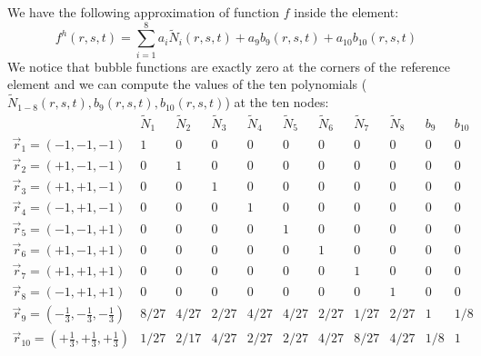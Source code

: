 We have the following approximation of function $f$ inside the element:
\[
f^h(r,s,t) = \sum_{i=1}^{8} a_i \tilde{N}_i(r,s,t) + a_9 b_9(r,s,t) + a_{10} b_{10}(r,s,t)
\]
We notice that bubble functions are exactly zero at the corners of the reference element and
we can compute the values of the ten polynomials ($\tilde{N}_{1-8}(r,s,t),b_9(r,s,t),b_{10}(r,s,t)$) 
at the ten nodes:
\[
\begin{array}{c|cccccccccc}
 & \tilde{N}_1 & \tilde{N}_2 & \tilde{N}_3 & \tilde{N}_4 & \tilde{N}_5 
 & \tilde{N}_6 & \tilde{N}_7 & \tilde{N}_8 & b_9 & b_{10}\\
 \hline\hline
\vec{r}_1=(-1,-1,-1)    &1 &0 &0 &0 &0 &0 &0 &0 &0 &0 \\
\vec{r}_2=(+1,-1,-1)    &0 &1 &0 &0 &0 &0 &0 &0 &0 &0 \\
\vec{r}_3=(+1,+1,-1)    &0 &0 &1 &0 &0 &0 &0 &0 &0 &0 \\
\vec{r}_4=(-1,+1,-1)    &0 &0 &0 &1 &0 &0 &0 &0 &0 &0 \\
\vec{r}_5=(-1,-1,+1)    &0 &0 &0 &0 &1 &0 &0 &0 &0 &0 \\
\vec{r}_6=(+1,-1,+1)    &0 &0 &0 &0 &0 &1 &0 &0 &0 &0 \\
\vec{r}_7=(+1,+1,+1)    &0 &0 &0 &0 &0 &0 &1 &0 &0 &0 \\
\vec{r}_8=(-1,+1,+1)    &0 &0 &0 &0 &0 &0 &0 &1 &0 &0 \\
\vec{r}_9=(-\frac13,-\frac13,-\frac13)    &8/27 & 4/27 & 2/27  & 4/27 & 4/27 & 2/27& 1/27& 2/27 &1 & 1/8\\
\vec{r}_{10}=(+\frac13,+\frac13,+\frac13) &1/27 & 2/17 & 4/27 & 2/27 & 2/27& 4/27& 8/27& 4/27& 1/8  &1 \\
\end{array}
\]




